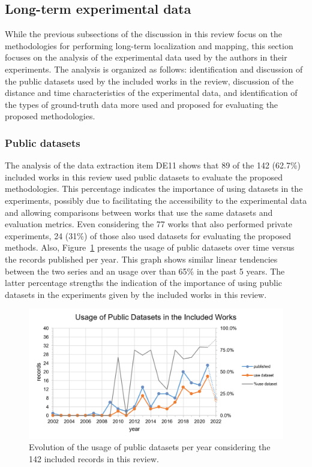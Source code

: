 \subsection{Long-term experimental data}
\label{sec:discussion:experiments}

While the previous subsections of the discussion in this review focus on the methodologies for performing long-term localization and mapping, this section focuses on the analysis of the experimental data used by the authors in their experiments. The analysis is organized as follows: identification and discussion of the public datasets used by the included works in the review, discussion of the distance and time characteristics of the experimental data, and identification of the types of ground-truth data more used and proposed for evaluating the proposed methodologies.



\subsubsection{Public datasets}

The analysis of the data extraction item DE11 shows that 89 of the 142 (62.7\%) included works in this review used public datasets to evaluate the proposed methodologies. This percentage indicates the importance of using datasets in the experiments, possibly due to facilitating the accessibility to the experimental data and allowing comparisons between works that use the same datasets and evaluation metrics. Even considering the 77 works that also performed private experiments, 24 (31\%) of those also used datasets for evaluating the proposed methods.
Also, Figure~\ref{fig:discussion:datasets} presents the usage of public datasets over time versus the records published per year.
This graph shows similar linear tendencies between the two series and an usage over than 65\% in the past 5 years. The latter percentage strengths the indication of the importance of using public datasets in the experiments given by the included works in this review.

\begin{figure}[!t]
  \centering
  \includegraphics[width=\columnwidth]{figures/datasets.png}
  \caption{Evolution of the usage of public datasets per year considering the 142 included records in this review.}
  \label{fig:discussion:datasets}
\end{figure}

